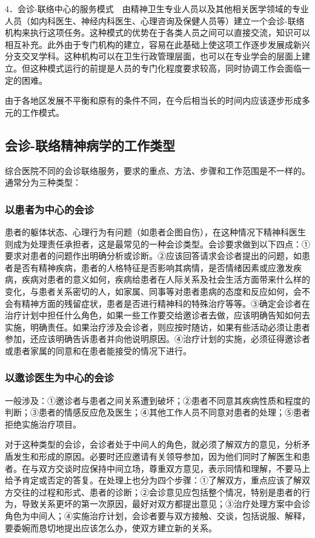 4．会诊-联络中心的服务模式　由精神卫生专业人员以及其他相关医学领域的专业人员（如内科医生、神经内科医生、心理咨询及保健人员等）建立一个会诊-联络机构来执行这项任务。这种模式的优势在于各类人员之间可以直接交流，知识可以相互补充。此外由于专门机构的建立，容易在此基础上使这项工作逐步发展成新兴分支交叉学科。这种机构可以在卫生行政管理层面，也可以在专业学会的层面上建立。但这种模式运行的前提是人员的专门化程度要求较高，同时协调工作会面临一定的困难。

由于各地区发展不平衡和原有的条件不同，在今后相当长的时间内应该逐步形成多元的工作模式。

\subsection{会诊-联络精神病学的工作类型}

综合医院不同的会诊联络服务，要求的重点、方法、步骤和工作范围是不一样的。通常分为三种类型：

\subsubsection{以患者为中心的会诊}

患者的躯体状态、心理行为有问题（如患者企图自伤），在这种情况下精神科医生则成为处理责任承担者，这是最常见的一种会诊类型。会诊要求做到以下四点：①要求对患者的问题作出明确分析或诊断。②应该回答请求会诊者提出的问题，如患者是否有精神疾病，患者的人格特征是否影响其病情，是否情绪因素或应激发疾病，疾病对患者的意义如何，疾病给患者在人际关系及社会生活方面带来什么样的变化，与患者关系密切的人，如家属、同事等对患者患病的态度和反应如何，会不会有精神方面的残留症状，患者是否进行精神科的特殊治疗等等。③确定会诊者在治疗计划中担任什么角色，如果一些工作要交给邀诊者去做，应该明确告知如何去实施，明确责任。如果治疗涉及会诊者，则应按时随访，如果有些活动必须让患者参加，还应该明确告诉患者并向他说明原因。④治疗计划的实施，必须征得邀诊者或患者家属的同意和在患者能接受的情况下进行。

\subsubsection{以邀诊医生为中心的会诊}

一般涉及：①邀诊者与患者之间关系遭到破坏；②患者不同意其疾病性质和程度的判断；③患者的情感反应危及医生；④其他工作人员不同意对患者的处理；⑤患者拒绝实施治疗项目。

对于这种类型的会诊，会诊者处于中间人的角色，就必须了解双方的意见，分析矛盾发生和形成的原因。必要时还应邀请有关领导参加，因为他们同时了解医生和患者。在与双方交谈时应保持中间立场，尊重双方意见，表示同情和理解，不要马上给予肯定或否定的答复。在处理上也分为四个步骤：①了解双方，重点应该了解双方交往的过程和形式、患者的诊断；②会诊意见应包括整个情况，特别是患者的行为，导致关系更坏的第一次原因，最好对双方都提出意见；③治疗处理方案中会诊角色为中间人；④实施治疗计划，会诊者要与双方接触、交谈，包括说服、解释，要委婉而恳切地提出应该怎么办，使双方建立新的关系。

